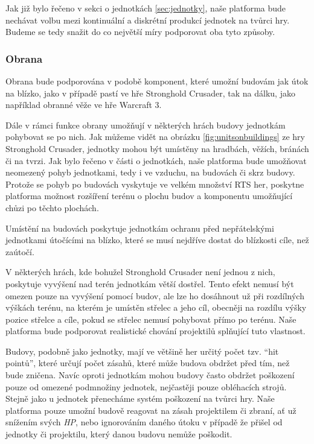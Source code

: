 Jak již bylo řečeno v sekci o jednotkách \ref{sec:jednotky}, naše platforma bude nechávat volbu mezi kontinuální a diskrétní produkcí jednotek na tvůrci hry. Budeme se tedy snažit do co největší míry podporovat oba tyto způsoby. 

\subsubsection{Obrana}

Obrana bude podporována v podobě komponent, které umožní budovám jak útok na blízko, jako v případě pastí ve hře Stronghold Crusader, tak na dálku, jako například obranné věže ve hře Warcraft 3. 

Dále v rámci funkce obrany umožňují v některých hrách budovy jednotkám pohybovat se po nich. Jak můžeme vidět na obrázku \ref{fig:unitsonbuildings} ze hry Stronghold Crusader, jednotky mohou být umístěny na hradbách, věžích, bránách či na tvrzi. Jak bylo řečeno v části o jednotkách, naše platforma bude umožňovat neomezený pohyb jednotkami, tedy i ve vzduchu, na budovách či skrz budovy. Protože se pohyb po budovách vyskytuje ve velkém množství RTS her, poskytne platforma možnost rozšíření terénu o plochu budov a komponentu umožňující chůzi po těchto plochách.

Umístění na budovách poskytuje jednotkám ochranu před nepřátelskými jednotkami útočícími na blízko, které se musí nejdříve dostat do blízkosti cíle, než zaútočí. 

V některých hrách, kde bohužel Stronghold Crusader není jednou z nich, poskytuje vyvýšení nad terén jednotkám větší dostřel. Tento efekt nemusí být omezen pouze na vyvýšení pomocí budov, ale lze ho dosáhnout už při rozdílných výškách terénu, na kterém je umístěn střelec a jeho cíl, obecněji na rozdílu výšky pozice střelce a cíle, pokud se střelec nemusí pohybovat přímo po terénu. Naše platforma bude podporovat realistické chování projektilů splňující tuto vlastnost. 

\done
{}
\done
{}

Budovy, podobně jako jednotky, mají ve většině her určitý počet tzv. ``hit pointů'', které určují počet zásahů, které může budova obdržet před tím, než bude zničena. Navíc oproti jednotkám mohou budovy často obdržet poškození pouze od omezené podmnožiny jednotek, nejčastěji pouze obléhacích strojů. Stejně jako u jednotek přenecháme systém poškození na tvůrci hry. Naše platforma pouze umožní budově reagovat na zásah projektilem či zbraní, ať už snížením svých \textit{HP}, nebo ignorováním daného útoku v případě že přišel od jednotky či projektilu, který danou budovu nemůže poškodit.


